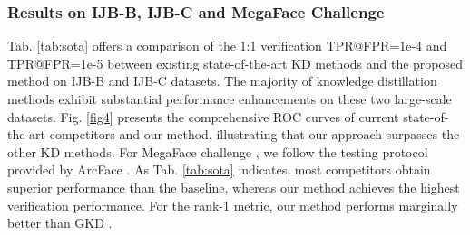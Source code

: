 \documentclass[sigconf]{acmart}
\begin{document}
\subsubsection{Results on IJB-B, IJB-C and MegaFace Challenge}
Tab. \ref{tab:sota} offers a comparison of the 1:1 verification TPR@FPR=1e-4 and TPR@FPR=1e-5 between existing state-of-the-art KD methods and the proposed method on IJB-B and IJB-C datasets. The majority of knowledge distillation methods exhibit substantial performance enhancements on these two large-scale datasets. Fig. \ref{fig4} presents the comprehensive ROC curves of current state-of-the-art competitors and our method, illustrating that our approach surpasses the other KD methods. For MegaFace challenge \cite{megaface}, we follow the testing protocol provided by ArcFace \cite{arcface}. As Tab. \ref{tab:sota} indicates, most competitors obtain superior performance than the baseline, whereas our method achieves the highest verification performance. For the rank-1 metric, our method performs marginally better than GKD \cite{gkd}.
\begin{table}[t]
    \centering
{}
\caption{Ablation experiments of Attention Space Alignment (ASA), Mutual alignment (Mutual), Adaptable Prompting Teacher network (APT) and Unified Receptive Fields Mapping (URFM). The baseline model is trained with FitNet \cite{fitnet}.}
\vspace{-0.3cm}
\label{tab:1}
\end{table}
\end{document}
